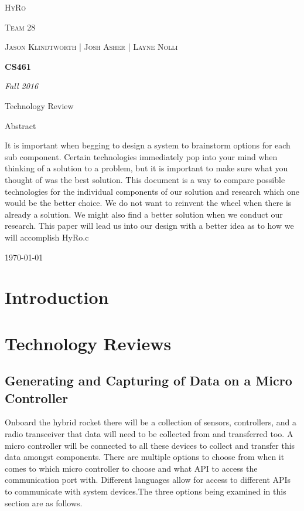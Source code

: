 \documentclass[10pt,draftclsnofoot,onecolumn]{IEEEtran}
\begin{document}
\begin{titlepage}
\centering
	{\scshape\LARGE HyRo \par}
	{\scshape\LARGE Team 28\par}
	\vspace{1cm}
	{\scshape\Large Jason Klindtworth  |  Josh Asher  |   Layne Nolli}
	\noindent\makebox[\linewidth]{\rule{17cm}{2pt}}
	\vspace{1cm}
	{\huge\bfseries CS461\par}
	\vspace{2cm}
	{\Large\itshape Fall 2016\par}
	\vspace{4cm}
	{\large Technology Review\par}
	\vspace{4cm}
	{\large Abstract\par}
	\vspace{1cm}
It is important when begging to design a system to brainstorm options for each sub component. Certain technologies immediately pop into your mind when thinking of a solution to a problem, but it is important to make sure what you thought of was the best solution. This document is a way to compare possible technologies for the individual components of our solution and research which one would be the better choice. We do not want to reinvent the wheel when there is already a solution. We might also find a better solution when we conduct our research. This paper will lead us into our design with a better idea as to how we will accomplish HyRo.c\\
	\noindent\makebox[\linewidth]{\rule{17cm}{2pt}}

	\vfill

	{\large \today\par}
\end{titlepage}
\tableofcontents

\section{Introduction}


\section{Technology Reviews}
\subsection{Generating and Capturing of Data on a Micro Controller}
Onboard the hybrid rocket there will be a collection of sensors, controllers, and a radio transceiver that data will need to be collected from and transferred too. A micro controller will be connected to all these devices to collect and transfer this data amongst components. There are multiple options to choose from when it comes to which micro controller to choose and what API to access the communication port with. Different languages allow for access to different APIs to communicate with system devices.The three options being examined in this section are as follows. \\
\end{document}
